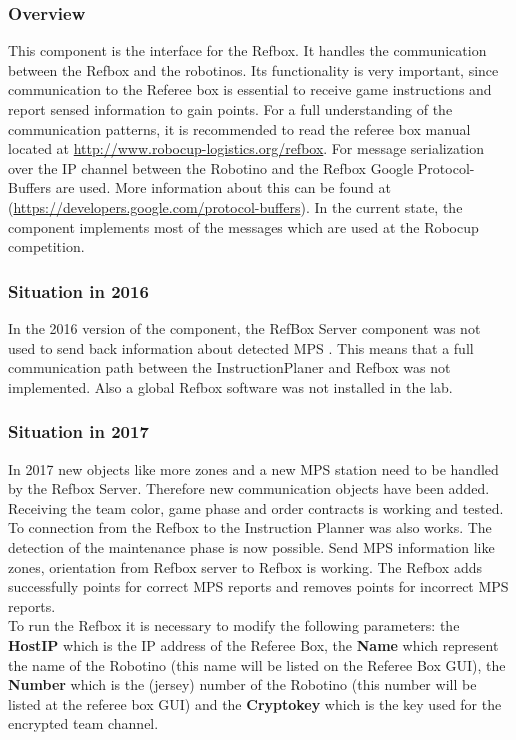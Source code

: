 
\subsubsection{Overview}

This component is the interface for the Refbox. It handles the communication between the Refbox and the robotinos. Its functionality is very important, since communication to the Referee box is essential to receive game instructions and report sensed information to gain points. For a full understanding of the communication patterns, it is recommended to read the referee box manual located at \url{ http://www.robocup-logistics.org/refbox}. For message serialization over the IP channel between the Robotino and the Refbox Google Protocol-Buffers are used. More information about this can be found at (\url{https://developers.google.com/protocol-buffers}). In the current state, the component implements most of the messages which are used at the Robocup competition.

\subsubsection{Situation in 2016}

In the 2016 version of the component, the RefBox Server component was not used to send back information about detected MPS \cite{BOK}. This means that a full communication path between the InstructionPlaner and Refbox was not implemented. Also a global Refbox software was not installed in the lab. 


\subsubsection{Situation in 2017}

In 2017 new objects like more zones and a new MPS station need to be handled by the Refbox Server. Therefore new communication objects have been added. Receiving the team color, game phase and order contracts is working and tested. To connection from the Refbox to the Instruction Planner was also works. The detection of the maintenance phase is now possible. Send MPS information like zones, orientation from Refbox server to Refbox is working. The Refbox adds successfully points for correct MPS reports and removes points for incorrect MPS reports. \\

To run the Refbox it is necessary to modify the following parameters: the \textbf{HostIP} which is the IP address of the Referee Box, the \textbf{Name} which represent the name of the Robotino (this name will be listed on the Referee Box GUI), the \textbf{Number} which is the (jersey) number of the Robotino (this number will be listed at the referee box GUI) and the \textbf{Cryptokey} which is the key used for the encrypted team channel.\\

